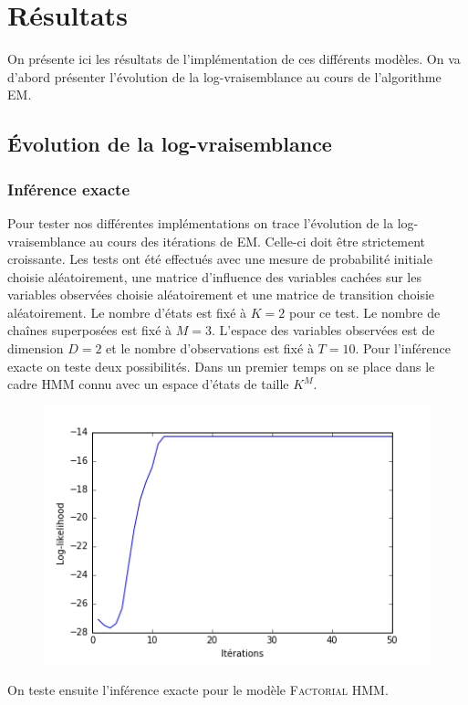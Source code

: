 \documentclass[10pt,a4paper]{article}
\newcommand{\hmm}{\textsc{HMM}}
\newcommand{\fhmm}{\textsc{Factorial HMM}}
\newcommand{\EM}{\textsc{EM}}
\begin{document}
\section{Résultats}
On présente ici les résultats de l'implémentation de ces différents modèles.  
On va d'abord présenter l'évolution de la log-vraisemblance au cours de 
l'algorithme \EM.
\subsection{Évolution de la log-vraisemblance}
\subsubsection{Inférence exacte}
Pour tester nos différentes implémentations on trace l'évolution de la 
log-vraisemblance au cours des itérations de \EM.
Celle-ci doit être strictement croissante.
Les tests ont été effectués avec une mesure de probabilité initiale choisie 
aléatoirement, une matrice d'influence des variables cachées sur les variables 
observées choisie aléatoirement et une matrice de transition choisie 
aléatoirement. Le nombre d'états est fixé à $K = 2$ pour ce test. Le nombre de 
chaînes superposées est fixé à $M = 3$. L'espace des variables observées est de 
dimension $D=2$ et le nombre d'observations est fixé à $T=10$. Pour 
l'inférence 
exacte on teste deux possibilités. Dans un premier temps on se place dans le 
cadre \hmm{} connu avec un espace d'états de taille $K^M$.
\begin{figure}[H]
\centering
\includegraphics[scale=0.5]{../resources/pictures/M3_K2_hmm.png}
\end{figure}
On teste ensuite l'inférence exacte pour le modèle \fhmm.
\end{document}
